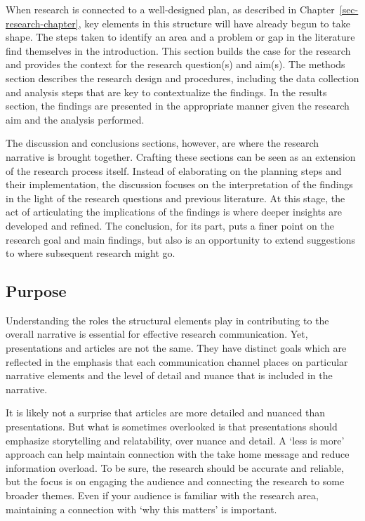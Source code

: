 \documentclass[
  letterpaper,
]{latex/krantz}
\theoremstyle{definition}
\theoremstyle{remark}
\begin{document}
When research is connected to a well-designed plan, as described in
Chapter~\ref{sec-research-chapter}, key elements in this structure will
have already begun to take shape. The steps taken to identify an area
and a problem or gap in the literature find themselves in the
introduction. This section builds the case for the research and provides
the context for the research question(s) and aim(s). The methods section
describes the research design and procedures, including the data
collection and analysis steps that are key to contextualize the
findings. In the results section, the findings are presented in the
appropriate manner given the research aim and the analysis performed.

The discussion and conclusions sections, however, are where the research
narrative is brought together. Crafting these sections can be seen as an
extension of the research process itself. Instead of elaborating on the
planning steps and their implementation, the discussion focuses on the
interpretation of the findings in the light of the research questions
and previous literature. At this stage, the act of articulating the
implications of the findings is where deeper insights are developed and
refined. The conclusion, for its part, puts a finer point on the
research goal and main findings, but also is an opportunity to extend
suggestions to where subsequent research might go.

\subsection{Purpose}\label{sec-contr-ao-purpose}

Understanding the roles the structural elements play in contributing to
the overall narrative is essential for effective research communication.
Yet, presentations and articles are not the same. They have distinct
goals which are reflected in the emphasis that each communication
channel places on particular narrative elements and the level of detail
and nuance that is included in the narrative.

It is likely not a surprise that articles are more detailed and nuanced
than presentations. But what is sometimes overlooked is that
presentations should emphasize storytelling and relatability, over
nuance and detail. A `less is more' approach can help maintain
connection with the take home message and reduce information overload.
To be sure, the research should be accurate and reliable, but the focus
is on engaging the audience and connecting the research to some broader
themes. Even if your audience is familiar with the research area,
maintaining a connection with `why this matters' is important.
\end{document}
